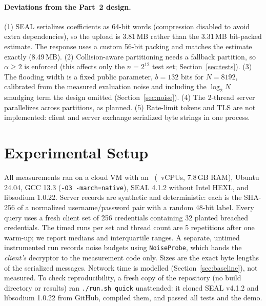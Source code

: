 \documentclass[11pt]{article}
\begin{document}
\paragraph{Deviations from the Part~2 design.} (1) SEAL serializes coefficients as 64-bit words (compression disabled to avoid extra dependencies), so the upload is 3.81\,MB rather than the 3.31\,MB bit-packed estimate. The response uses a custom 56-bit packing and matches the estimate exactly (8.49\,MB). (2) Collision-aware partitioning needs a fallback partition, so $\alpha\ge2$ is enforced (this affects only the $n=2^{12}$ test set; Section~\ref{sec:tests}). (3) The flooding width is a fixed public parameter, $b=132$ bits for $N=8192$, calibrated from the measured evaluation noise and including the $\log_2 N$ smudging term the design omitted (Section~\ref{sec:noise}). (4) The 2-thread server parallelizes across partitions, as planned. (5) Rate-limit tokens and TLS are not implemented: client and server exchange serialized byte strings in one process.

\section{Experimental Setup}
All measurements ran on a cloud VM with an \CPU\ (\HWThreads\ vCPUs, 7.8\,GB RAM), Ubuntu 24.04, GCC 13.3 (\texttt{-O3 -march=native}), SEAL 4.1.2 without Intel HEXL, and libsodium 1.0.22. Server records are synthetic and deterministic: each is the SHA-256 of a normalized username/password pair with a random 48-bit label. Every query uses a fresh client set of 256 credentials containing 32 planted breached credentials. The timed runs per set and thread count are 5 repetitions after one warm-up; we report medians and interquartile ranges. A separate, untimed instrumented run records noise budgets using \texttt{NoiseProbe}, which hands the \emph{client's} decryptor to the measurement code only. Sizes are the exact byte lengths of the serialized messages. Network time is modelled (Section~\ref{sec:baseline}), not measured. To check reproducibility, a fresh copy of the repository (no build directory or results) ran \texttt{./run.sh quick} unattended: it cloned SEAL v4.1.2 and libsodium 1.0.22 from GitHub, compiled them, and passed all tests and the demo.
\end{document}
